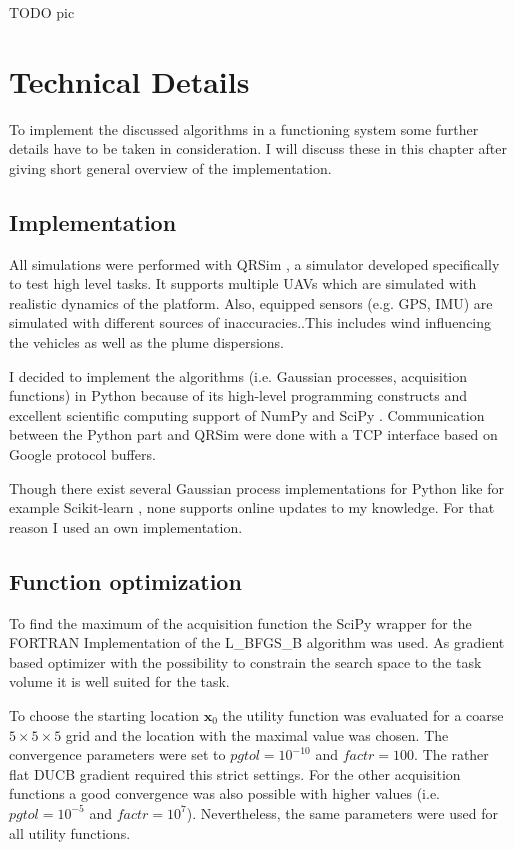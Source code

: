 \documentclass[11pt,a4paper,twoside,BCOR=15mm]{scrreprt}
\newcommand{\vc}[1]{\bm{#1}}
\begin{document}
TODO pic

\chapter{Technical Details}
To implement the discussed algorithms in a functioning system some further 
details have to be taken in consideration. I will discuss these in this chapter 
after giving short general overview of the implementation.

\section{Implementation}
All simulations were performed with QRSim \parencite{denardi2013rn}, a simulator 
developed specifically to test high level tasks. It supports multiple UAVs which 
are simulated with realistic dynamics of the platform. Also, equipped sensors 
(e.g.  GPS, IMU) are simulated with different sources of inaccuracies..This 
includes wind influencing the vehicles as well as the plume dispersions.

I decided to implement the algorithms (i.e. Gaussian processes, acquisition 
functions) in Python because of its high-level programming constructs and 
excellent scientific computing support of NumPy and SciPy 
\parencite{Oliphant:2007dm}. Communication between the Python part and QRSim 
were done with a TCP interface based on Google protocol buffers.

Though there exist several Gaussian process implementations for Python like for 
example Scikit-learn \parencite[i.e.][]{scikit-learn}, none supports online 
updates to my knowledge.  For that reason I used an own implementation.

\section{Function optimization}
To find the maximum of the acquisition function the SciPy wrapper for the 
FORTRAN Implementation of the L\_BFGS\_B algorithm \parencite{Byrd:2006iv, 
    Zhu:1997br} was used. As gradient based optimizer with the possibility to 
constrain the search space to the task volume it is well suited for the task.

To choose the starting location $\vc x_0$ the utility function was evaluated for 
a coarse $5 \times 5 \times 5$ grid and the location with the maximal value was 
chosen. The convergence parameters were set to $\mathit{pgtol} = 10^{-10}$ and 
$\mathit{factr} = 100$. The rather flat DUCB gradient required this strict 
settings. For the other acquisition functions a good convergence was also 
possible with higher values (i.e.~$\mathit{pgtol} = 10^{-5}$ and $\mathit{factr} 
= 10^7$).  Nevertheless, the same parameters were used for all utility 
functions.
\end{document}
